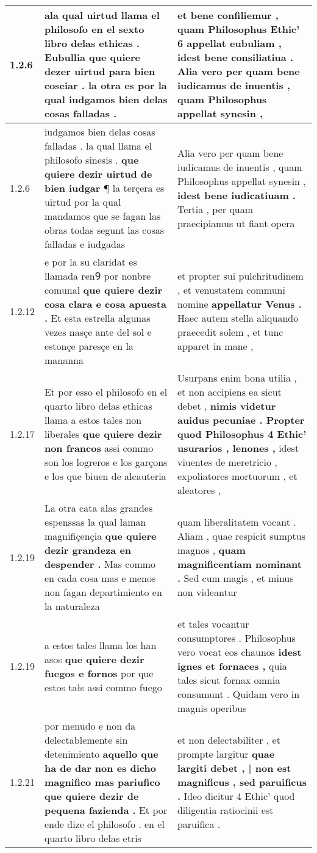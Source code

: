\begin{tabular}{|p{1cm}|p{6.5cm}|p{6.5cm}|}
1.2.6 & ala qual uirtud llama el philosofo en el sexto libro delas ethicas . \textbf{ Eubullia que quiere dezer uirtud para bien coseiar . } la otra es por la qual iudgamos bien delas cosas falladas . & et bene confiliemur , quam Philosophus Ethic’ 6 appellat eubuliam , \textbf{ idest bene consiliatiua . } Alia vero per quam bene iudicamus de inuentis , quam Philosophus appellat synesin , \\\hline
1.2.6 & iudgamos bien delas cosas falladas . la qual llama el philosofo sinesis . \textbf{ que quiere dezir uirtud de bien iudgar } ¶ la terçera es uirtud por la qual mandamos que se fagan las obras todas segunt las cosas falladas e iudgadas & Alia vero per quam bene iudicamus de inuentis , quam Philosophus appellat synesin , \textbf{ idest bene iudicatiuam . } Tertia , per quam praecipiamus ut fiant opera \\\hline
1.2.12 & e por la su claridat es llamada renꝮ por nonbre comunal \textbf{ que quiere dezir cosa clara e cosa apuesta . } Et esta estrella algunas vezes nasçe ante del sol e estonçe paresçe en la mananna & et propter sui pulchritudinem , et venustatem communi nomine \textbf{ appellatur Venus . } Haec autem stella aliquando praecedit solem , et tunc apparet in mane , \\\hline
1.2.17 & Et por esso el philosofo en el quarto libro delas ethicas llama a estos tales non liberales \textbf{ que quiere dezir non francos } assi commo son los logreros e los garçons e los que biuen de alcauteria & Usurpans enim bona utilia , et non accipiens ea sicut debet , \textbf{ nimis videtur auidus pecuniae . Propter quod Philosophus 4 Ethic’ usurarios , lenones , } idest viuentes de meretricio , expoliatores mortuorum , et aleatores , \\\hline
1.2.19 & La otra cata alas grandes espenssas la qual laman magnifiçençia \textbf{ que quiere dezir grandeza en despender . } Mas commo en cada cosa mas e menos non fagan departimiento en la naturaleza & quam liberalitatem vocant . Aliam , quae respicit sumptus magnos , \textbf{ quam magnificentiam nominant . } Sed cum magis , et minus non videantur \\\hline
1.2.19 & a estos tales llama los han asos \textbf{ que quiere dezir fuegos e fornos } por que estos tałs assi commo fuego & et tales vocantur consumptores . Philosophus vero vocat eos chaunos \textbf{ idest ignes et fornaces , } quia tales sicut fornax omnia consumunt . Quidam vero in magnis operibus \\\hline
1.2.21 & por menudo e non da delectablemente sin detenimiento \textbf{ aquello que ha de dar non es dicho magnifico mas pariufico que quiere dezir de pequena fazienda . } Et por ende dize el philosofo . en el quarto libro delas etris & et non delectabiliter , et prompte largitur \textbf{ quae largiti debet , | non est magnificus , sed paruificus . } Ideo dicitur 4 Ethic’ quod diligentia ratiocinii est paruifica . \\\hline

\end{tabular}
